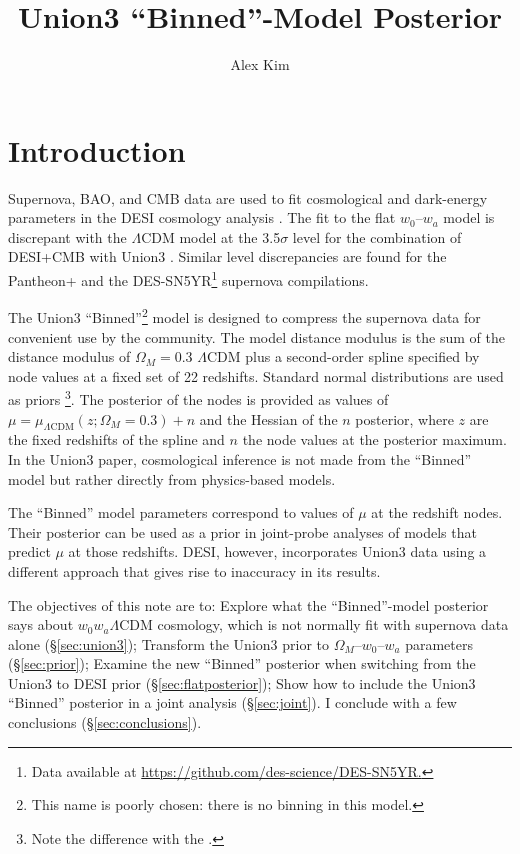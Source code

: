 \documentclass[11pt,a4paper]{article}
\title{Union3 ``Binned''-Model Posterior}
\author[a]{Alex Kim}
\affiliation[a]{Lawrence Berkeley National Laboratory}
\begin{document}
\maketitle

\section{Introduction}
Supernova, BAO, and CMB data are used to fit cosmological and dark-energy parameters in the DESI cosmology
analysis \cite{2024arXiv240403002D}.  The fit to the flat $w_0$--$w_a$ model is discrepant with the $\Lambda$CDM
model at the 3.5$\sigma$ level for the combination of DESI+CMB with Union3  \cite{2023arXiv231112098R}.
Similar level discrepancies are found for the Pantheon+ \cite{2022ApJ...938..113S} and the DES-SN5YR\footnote{Data available at \url{https://github.com/des-science/DES-SN5YR.}} supernova compilations.



The Union3 ``Binned''\footnote{This name is poorly chosen: there is no binning in this model.} model is designed to compress the  supernova data for convenient use by the community.  
The  model distance modulus
is the sum of the distance modulus of $\Omega_M=0.3$  $\Lambda$CDM plus a second-order spline specified by node values
at a fixed set of 22 redshifts.   Standard normal distributions are used as priors \footnote{Note the difference with the .}.  
The posterior of the nodes is provided  as values of
$\mu = \mu_{\Lambda \text{CDM}}(z;\Omega_M=0.3) + n$ and the Hessian of the $n$ posterior,
where $z$ are the fixed redshifts of the spline and $n$ the node values at the posterior maximum.
In the Union3 paper, cosmological inference is not made from the ``Binned'' model but rather directly from physics-based models.

The ``Binned'' model parameters correspond to values of $\mu$ at the redshift nodes.
Their  posterior can  be used as a prior in joint-probe analyses of models that predict $\mu$ at those redshifts. 
DESI, however, incorporates Union3 data using a different approach that gives rise to inaccuracy in its results.

The objectives of this note are to: Explore what the ``Binned''-model posterior says about $w_0w_a\Lambda$CDM cosmology, which is not normally
fit with  supernova data alone (\S\ref{sec:union3}); Transform the Union3 prior to $\Omega_M$--$w_0$--$w_a$ parameters
(\S\ref{sec:prior});
Examine the new ``Binned'' posterior when switching from the Union3 to DESI prior
(\S\ref{sec:flatposterior}); Show how to include the Union3 ``Binned'' posterior in a joint analysis (\S\ref{sec:joint}).
I conclude with a few conclusions (\S\ref{sec:conclusions}).
\end{document}
